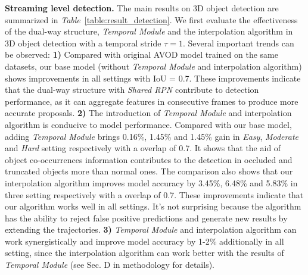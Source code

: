 \documentclass[letterpaper, 10pt, conference]{ieeeconf}  %
\def\tablename{\emph{Table}}
\begin{document}
\textbf{Streaming level detection.} The main results on 3D object detection are summarized in \tablename \, \ref{table:result_detection}. We first evaluate the effectiveness of the dual-way structure, \textit{Temporal Module} and the interpolation algorithm in 3D object detection with a temporal stride $\tau = 1$. Several important trends can be observed: \textbf{1)} Compared with original AVOD \cite{ku2018joint} model trained on the same datasets, our base model (without \textit{Temporal Module} and interpolation algorithm) shows improvements in all settings with IoU = 0.7. These improvements indicate that the dual-way structure with \textit{Shared RPN} contribute to detection performance, as it can aggregate features in consecutive frames to produce more accurate proposals. \textbf{2)} The introduction of \textit{Temporal Module} and interpolation algorithm is conducive to model performance. Compared with our base model, adding \textit{Temporal Module} brings 0.16\%, 1.45\% and 1.45\% gain in \textit{Easy}, \textit{Moderate} and \textit{Hard} setting respectively with a overlap of 0.7. It shows that the aid of object co-occurrences information contributes to the detection in occluded and truncated objects more than normal ones. The comparison also shows that our interpolation algorithm improves model accuracy by 3.45\%, 6.48\% and 5.83\% in three setting respectively with a overlap of 0.7. These improvements indicate that our algorithm works well in all settings. It's not surprising because the algorithm has the ability to reject false positive predictions and generate new results by extending the trajectories. \textbf{3)} \textit{Temporal Module} and interpolation algorithm can work synergistically and improve model accuracy by 1-2\% additionally in all setting, since the interpolation algorithm can work better with the results of \textit{Temporal Module} (see Sec. D in methodology for details). 
\end{document}
